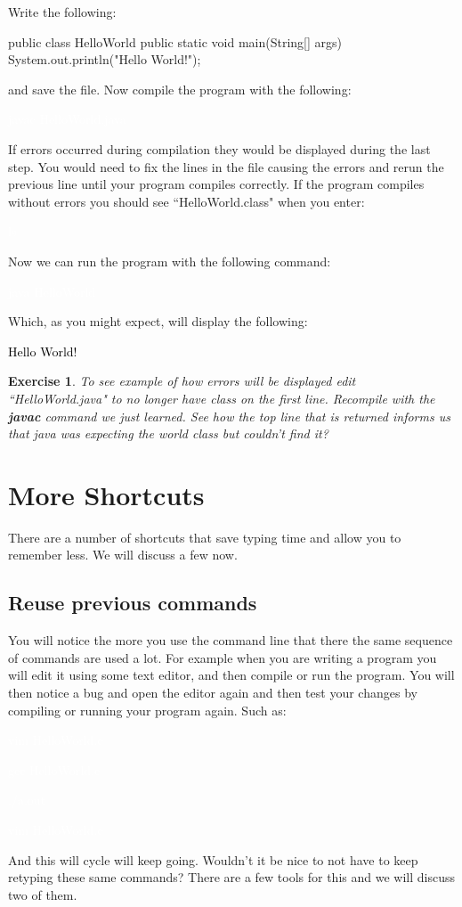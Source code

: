 \documentclass[oneside]{book}
\newcommand{\commandline}[1]{\begin{center} \colorbox{Dark}{\textcolor{white}{#1}} \end{center}}
\newcommand{\exampleout}[1]{\begin{center} \colorbox{Light}{\textcolor{black}{#1}} \end{center}}
\newtheorem{ex}{Exercise}[chapter]
\begin{document}
Write the following:

\begin{verbatimtab}
    public class HelloWorld {
        public static void main(String[] args) {
            System.out.println("Hello World!");
        }
    }
\end{verbatimtab}
and save the file. Now compile the program with the following:
\commandline{javac HelloWorld.java}
If errors occurred during compilation they would be displayed during the last step. You would need to fix the lines in the file causing the errors and rerun the previous line until your program compiles correctly. If the program compiles without errors you should see ``HelloWorld.class" when you enter:
\commandline{ls}
Now we can run the program with the following command:
\commandline{java HelloWorld}
Which, as you might expect, will display the following:
\exampleout{Hello World!}

\vspace{0.5cm}

\begin{ex}
    To see example of how errors will be displayed edit ``HelloWorld.java" to no longer have class on the first line. Recompile with the \textbf{javac} command we just learned. See how the top line that is returned informs us that java was expecting the world class but couldn't find it?
\end{ex}

\newpage
\section{More Shortcuts}
There are a number of shortcuts that save typing time and allow you to remember less. We will discuss a few now.
\subsection{Reuse previous commands}
You will notice the more you use the command line that there the same sequence of commands are used a lot. For example when you are writing a program you will edit it using some text editor, and then compile or run the program. You will then notice a bug and open the editor again and then test your changes by compiling or running your program again. Such as:
\commandline{vim HelloWorld.c}
\commandline{gcc HelloWorld.c}
\commandline{./a.out}
\commandline{vim HelloWorld.c}
And this will cycle will keep going. Wouldn't it be nice to not have to keep retyping these same commands? There are a few tools for this and we will discuss two of them. 
\end{document}

